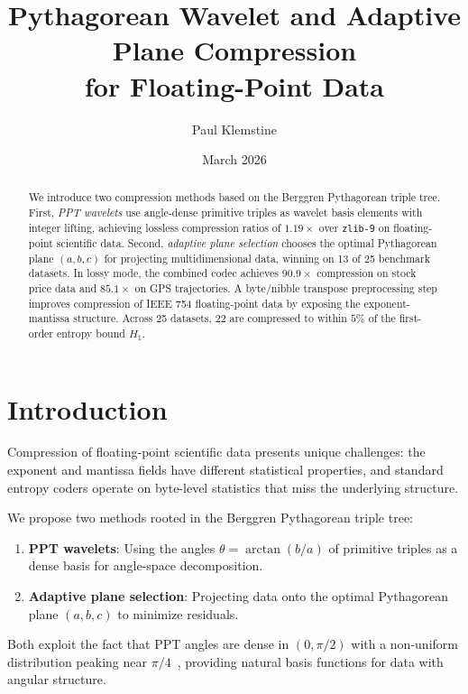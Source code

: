 \documentclass[12pt]{amsart}
\title{Pythagorean Wavelet and Adaptive Plane Compression\\
for Floating-Point Data}
\author{Paul Klemstine}
\date{March 2026}
\theoremstyle{definition}
\theoremstyle{remark}
\begin{document}
\begin{abstract}
We introduce two compression methods based on the Berggren Pythagorean triple
tree. First, \emph{PPT wavelets} use angle-dense primitive triples as wavelet
basis elements with integer lifting, achieving lossless compression ratios of
$1.19\times$ over \texttt{zlib-9} on floating-point scientific data. Second,
\emph{adaptive plane selection} chooses the optimal Pythagorean plane
$(a, b, c)$ for projecting multidimensional data, winning on 13 of 25 benchmark
datasets. In lossy mode, the combined codec achieves $90.9\times$ compression
on stock price data and $85.1\times$ on GPS trajectories. A byte/nibble
transpose preprocessing step improves compression of IEEE 754 floating-point
data by exposing the exponent-mantissa structure. Across 25 datasets, 22 are
compressed to within $5\%$ of the first-order entropy bound $H_1$.
\end{abstract}

\maketitle

\section{Introduction}\label{sec:intro}

Compression of floating-point scientific data presents unique challenges:
the exponent and mantissa fields have different statistical properties,
and standard entropy coders operate on byte-level statistics that miss
the underlying structure.

We propose two methods rooted in the Berggren Pythagorean triple tree:
\begin{enumerate}
  \item \textbf{PPT wavelets}: Using the angles $\theta = \arctan(b/a)$ of
    primitive triples as a dense basis for angle-space decomposition.
  \item \textbf{Adaptive plane selection}: Projecting data onto the optimal
    Pythagorean plane $(a, b, c)$ to minimize residuals.
\end{enumerate}

Both exploit the fact that PPT angles are dense in $(0, \pi/2)$ with a
non-uniform distribution peaking near $\pi/4$~\cite{PaperAlgebra}, providing
natural basis functions for data with angular structure.
\end{document}
